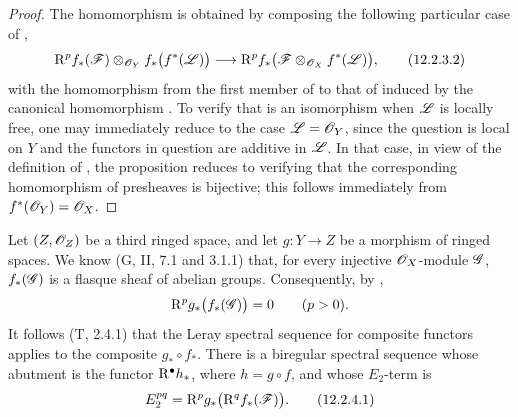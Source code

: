 \begin{proof}
The homomorphism  is obtained by composing the
following particular case of ,
\[
  \mathrm{R}^p f_*(\mathscr{F})
    \otimes_{\mathscr{O}_Y}f_*\bigl(f^*(\mathscr{L})\bigr)
  \longrightarrow
  \mathrm{R}^p f_*
    \bigl(\mathscr{F}\otimes_{\mathscr{O}_X}f^*(\mathscr{L})\bigr),
  \tag{12.2.3.2}
  \label{0.12.2.3.2}
\]
with the homomorphism from the first member of
 to that of  induced by the
canonical homomorphism .
To verify that  is an isomorphism when $\mathscr{L}$ is
locally free, one may immediately reduce to the case
$\mathscr{L}=\mathscr{O}_Y$, since the question is local on $Y$ and the
functors in question are additive in $\mathscr{L}$.
In that case, in view of the definition of , the
proposition reduces to verifying that the corresponding homomorphism
of presheaves is bijective; this follows immediately from
$f^*(\mathscr{O}_Y)=\mathscr{O}_X$.
\end{proof}

\begin{env}[12.2.4]
\label{0.12.2.4}
Let $(Z,\mathscr{O}_Z)$ be a third ringed space, and let
$g:Y\to Z$ be a morphism of ringed spaces.
We know (G, II, 7.1 and 3.1.1) that, for every injective
$\mathscr{O}_X$-module $\mathscr{G}$, $f_*(\mathscr{G})$ is a flasque sheaf of
abelian groups.  Consequently, by ,
\[
  \mathrm{R}^p g_*\bigl(f_*(\mathscr{G})\bigr)=0
  \qquad(p>0).
\]
It follows (T, 2.4.1) that the Leray spectral sequence for composite
functors applies to the composite $g_*\circ f_*$.  There is a
biregular spectral sequence whose abutment is the functor
$\mathrm{R}^\bullet h_*$, where $h=g\circ f$, and whose $E_2$-term is
\[
  E_2^{pq}=\mathrm{R}^p g_*\bigl(\mathrm{R}^q f_*(\mathscr{F})\bigr).
  \tag{12.2.4.1}
  \label{0.12.2.4.1}
\]
\end{env}

